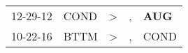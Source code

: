 \begin{supertabular}{p{0.07\textwidth}p{0.06\textwidth}p{0.02\textwidth}p{0.02\textwidth}p{0.06\textwidth}}
 12-29-12\textsuperscript{} &  COND\textsuperscript{} &  \textgreater &  , &  \textbf{AUG\textsuperscript{}} \\
 10-22-16\textsuperscript{} &  BTTM\textsuperscript{} &  \textgreater &  , &          COND\textsuperscript{} \\
\end{supertabular}
